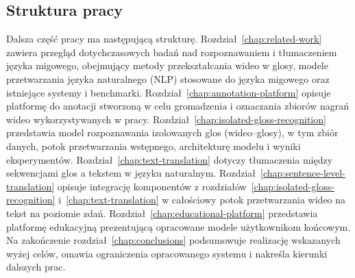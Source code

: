 
\subsection{Struktura pracy}
\label{sec:thesis-structure}

Dalsza część pracy ma następującą strukturę.
Rozdział~\ref{chap:related-work} zawiera przegląd dotychczasowych badań nad
rozpoznawaniem i tłumaczeniem języka migowego, obejmujący metody przekształcania
wideo w glosy, modele przetwarzania języka naturalnego (NLP) stosowane do języka
migowego oraz istniejące systemy i benchmarki.
Rozdział~\ref{chap:annotation-platform} opisuje platformę do anotacji stworzoną
w celu gromadzenia i oznaczania zbiorów nagrań wideo wykorzystywanych w pracy.
Rozdział~\ref{chap:isolated-gloss-recognition} przedstawia model rozpoznawania
izolowanych glos (wideo--glosy), w tym zbiór danych, potok przetwarzania wstępnego,
architekturę modelu i wyniki eksperymentów.
Rozdział~\ref{chap:text-translation} dotyczy tłumaczenia między sekwencjami glos
a tekstem w języku naturalnym.
Rozdział~\ref{chap:sentence-level-translation} opisuje integrację komponentów
z rozdziałów~\ref{chap:isolated-gloss-recognition} i~\ref{chap:text-translation}
w całościowy potok przetwarzania wideo na tekst na poziomie zdań.
Rozdział~\ref{chap:educational-platform} przedstawia platformę edukacyjną
prezentującą opracowane modele użytkownikom końcowym.
Na zakończenie rozdział~\ref{chap:conclusions} podsumowuje realizację wskazanych
wyżej celów, omawia ograniczenia opracowanego systemu i nakreśla kierunki
dalszych prac.